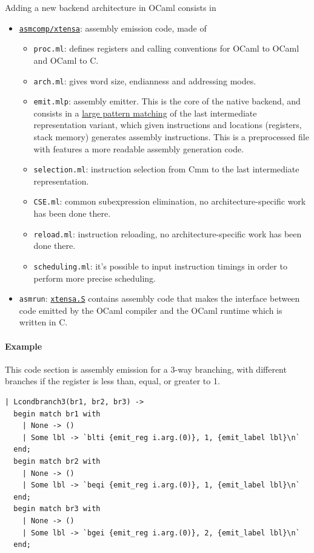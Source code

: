 \documentclass[a4paper]{article}
\begin{document}
Adding a new backend architecture in OCaml consists in 
\begin{itemize}
\item \href{https://github.com/well-typed-lightbulbs/ocaml-esp32/tree/4.06-esp32+lto/asmcomp/xtensa}{\texttt{asmcomp/xtensa}}: assembly emission code, made of
    \begin{itemize}[itemsep=0pt,parsep=0pt]
    \item \texttt{proc.ml}: defines registers and calling conventions for OCaml to OCaml and OCaml to C.
    \item \texttt{arch.ml}: gives word size, endianness and addressing modes.
    \item \texttt{emit.mlp}: assembly emitter. This is the core of the native backend, and consists in a \href{https://github.com/well-typed-lightbulbs/ocaml-esp32/blob/4.06-esp32+lto/asmcomp/xtensa/emit.mlp\#L336}{large pattern matching} of the last intermediate representation variant, which given instructions and locations (registers, stack memory) generates assembly instructions. This is a preprocessed file with features a more readable assembly generation code. 
    \item \texttt{selection.ml}: instruction selection from Cmm to the last intermediate representation.
    \item \texttt{CSE.ml}: common subexpression elimination, no architecture-specific work has been done there.
    \item \texttt{reload.ml}: instruction reloading, no architecture-specific work has been done there.
    \item \texttt{scheduling.ml}: it's possible to input instruction timings in order to perform more precise scheduling.
    \end{itemize}
\item \texttt{asmrun}: \href{https://github.com/well-typed-lightbulbs/ocaml-esp32/blob/4.06-esp32+lto/asmrun/xtensa.S}{\texttt{xtensa.S}} contains assembly code that makes the interface between code emitted by the OCaml compiler and the OCaml runtime which is written in C.
\end{itemize}
\paragraph{Example}
This code section is assembly emission for a 3-way branching, with different branches if the register is less than, equal, or greater to 1.
\begin{verbatim}
| Lcondbranch3(br1, br2, br3) -> 
  begin match br1 with
    | None -> ()
    | Some lbl -> `blti	{emit_reg i.arg.(0)}, 1, {emit_label lbl}\n`
  end;
  begin match br2 with
    | None -> ()
    | Some lbl -> `beqi	{emit_reg i.arg.(0)}, 1, {emit_label lbl}\n`
  end;
  begin match br3 with
    | None -> ()
    | Some lbl -> `bgei	{emit_reg i.arg.(0)}, 2, {emit_label lbl}\n`
  end;
\end{verbatim}
\end{document}
